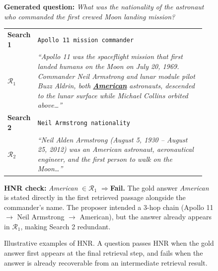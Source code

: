 \documentclass{article}
\begin{document}
\begin{figure}[t]
\begin{tcolorbox}[appbox,title={Hop Necessity Rate: Illustrative Examples},width=\textwidth]
\begin{tcolorbox}[failbox,title={HNR Fail \#2: Answer Leaked in First Retrieval (3-hop chain)}]
\smallskip
\textbf{Generated question:} \emph{What was the nationality of the astronaut who commanded the first crewed Moon landing mission?}

\medskip
\begin{tabular}{@{}p{0.10\linewidth}p{0.84\linewidth}@{}}
\textbf{Search 1} & \texttt{Apollo 11 mission commander} \\[1mm]
$\mathcal{R}_1$ &
\begin{minipage}[t]{\linewidth}
\small\itshape
``Apollo 11 was the spaceflight mission that first landed humans on the Moon on July 20, 1969. Commander Neil Armstrong and lunar module pilot Buzz Aldrin, both \textbf{\underline{American}} astronauts, descended to the lunar surface while Michael Collins orbited above\ldots''
\end{minipage}\\[3mm]
\textbf{Search 2} & \texttt{Neil Armstrong nationality} \\[1mm]
$\mathcal{R}_2$ &
\begin{minipage}[t]{\linewidth}
\small\itshape
``Neil Alden Armstrong (August 5, 1930 -- August 25, 2012) was an American astronaut, aeronautical engineer, and the first person to walk on the Moon\ldots''
\end{minipage}\\
\end{tabular}

\medskip
\textbf{HNR check:} \emph{American} $\in \mathcal{R}_1$ \quad$\Rightarrow$\quad \textcolor{red!70!black}{\textbf{Fail.}}
The gold answer \emph{American} is stated directly in the first retrieved passage alongside the commander's name. The proposer intended a 3-hop chain (Apollo 11 $\to$ Neil Armstrong $\to$ American), but the answer already appears in $\mathcal{R}_1$, making Search 2 redundant.
\end{tcolorbox}

\end{tcolorbox}

\caption{
Illustrative examples of HNR.
A question passes HNR when the gold answer first appears at the final retrieval step, and fails when the answer is already recoverable from an intermediate retrieval result.
}
\label{fig:hnr_examples}
\end{figure}


\newpage

\end{document}
